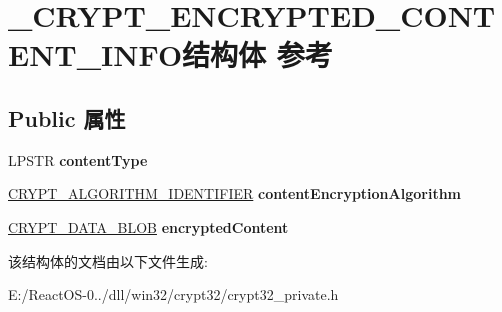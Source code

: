 \hypertarget{struct___c_r_y_p_t___e_n_c_r_y_p_t_e_d___c_o_n_t_e_n_t___i_n_f_o}{}\section{\+\_\+\+C\+R\+Y\+P\+T\+\_\+\+E\+N\+C\+R\+Y\+P\+T\+E\+D\+\_\+\+C\+O\+N\+T\+E\+N\+T\+\_\+\+I\+N\+F\+O结构体 参考}
\label{struct___c_r_y_p_t___e_n_c_r_y_p_t_e_d___c_o_n_t_e_n_t___i_n_f_o}
\subsection*{Public 属性}
\begin{DoxyCompactItemize}
\item 
\mbox{\label{struct___c_r_y_p_t___e_n_c_r_y_p_t_e_d___c_o_n_t_e_n_t___i_n_f_o_a03c364d7ae5cf38e1883bdfa41cda885}} 
L\+P\+S\+TR {\bfseries content\+Type}
\item 
\mbox{\label{struct___c_r_y_p_t___e_n_c_r_y_p_t_e_d___c_o_n_t_e_n_t___i_n_f_o_a5a1f0121ee49da060a3433e2cabe79b9}} 
\hyperlink{struct___c_r_y_p_t___a_l_g_o_r_i_t_h_m___i_d_e_n_t_i_f_i_e_r}{C\+R\+Y\+P\+T\+\_\+\+A\+L\+G\+O\+R\+I\+T\+H\+M\+\_\+\+I\+D\+E\+N\+T\+I\+F\+I\+ER} {\bfseries content\+Encryption\+Algorithm}
\item 
\mbox{\label{struct___c_r_y_p_t___e_n_c_r_y_p_t_e_d___c_o_n_t_e_n_t___i_n_f_o_ab91f3749f9c0c21a900d0bca49f6ffcb}} 
\hyperlink{struct___c_r_y_p_t_o_a_p_i___b_l_o_b}{C\+R\+Y\+P\+T\+\_\+\+D\+A\+T\+A\+\_\+\+B\+L\+OB} {\bfseries encrypted\+Content}
\end{DoxyCompactItemize}


该结构体的文档由以下文件生成\+:\begin{DoxyCompactItemize}
\item 
E\+:/\+React\+O\+S-\/0../dll/win32/crypt32/crypt32\+\_\+private.\+h\end{DoxyCompactItemize}
